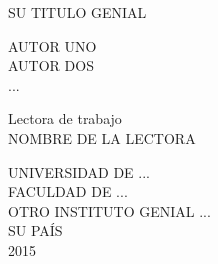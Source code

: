 \begin{titlepage}

\begin{center}
\uppercase{Su titulo genial}
\end{center}
\begin{center}
\vspace{\baselineskip}
\vspace{\baselineskip}
\vspace{\baselineskip}
\vspace{\baselineskip}
\vspace{\baselineskip}
\uppercase{
Autor uno\\
Autor dos\\
...\\
} 
\end{center}
\vspace{\baselineskip}
\vspace{\baselineskip}
\vspace{\baselineskip}
\begin{center}
Lectora de trabajo\\
\uppercase{Nombre de la lectora}
\end{center}
\begin{center}
\vspace{\baselineskip}
\vspace{\baselineskip}
\vspace{\baselineskip}
\vspace{\baselineskip}
\uppercase{
Universidad de ... \\
Faculdad de ...\\
Otro instituto genial ...\\
Su país \\
2015\\
}
\end{center}

\end{titlepage}
